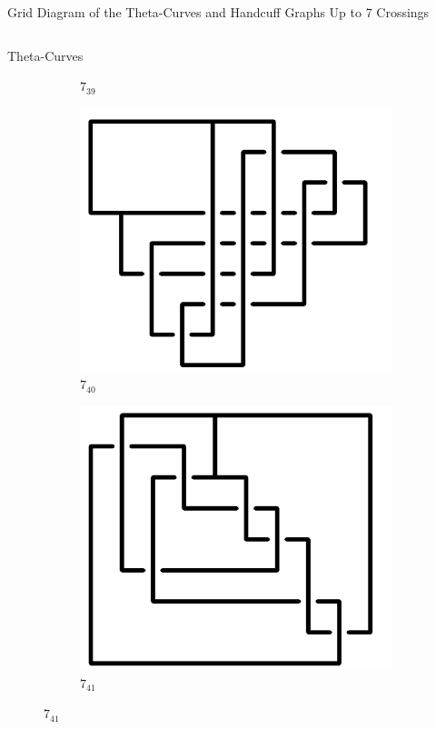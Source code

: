 \documentclass[final]{beamer}
\begin{document}
\begin{frame}[t]
\begin{alertblock}{Grid Diagram of the Theta-Curves and Handcuff Graphs Up to 7 Crossings}
\begin{columns}[t]
\begin{column}{0.5\textwidth}
\begin{alertblock}{Theta-Curves}
\begin{figure}
\begin{subfigure}{0.075\textwidth}
    \caption{$7_{39}$} 
    \end{subfigure}
    \begin{subfigure}{0.075\textwidth}
    \includegraphics[width=\columnwidth]{../Midterm_Poster/grid_diagram/theta_7_40.png}
    \caption{$7_{40}$} 
    \end{subfigure}
    \begin{subfigure}{0.075\textwidth}
    \includegraphics[width=\columnwidth]{../Midterm_Poster/grid_diagram/theta_7_41.png}
    \caption{$7_{41}$} 

\end{subfigure}
\end{figure}
\end{alertblock}
\end{column}
\end{columns}
\end{alertblock}
\end{frame}
\end{document}
